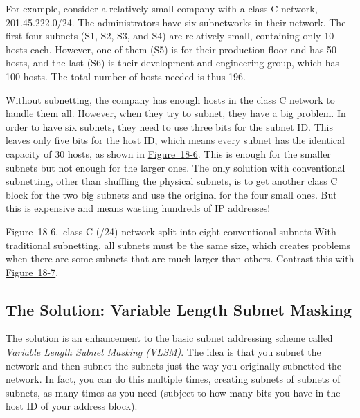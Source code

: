 \documentclass[b5paper,11pt]{memoir}
\begin{document}
For example, consider a relatively small company with a class C network,
201.45.222.0/24. The administrators have six subnetworks in their
network. The first four subnets (S1, S2, S3, and S4) are relatively
small, containing only 10 hosts each. However, one of them (S5) is for
their production floor and has 50 hosts, and the last (S6) is their
development and engineering group, which has 100 hosts. The total number
of hosts needed is thus 196.

Without subnetting, the company has enough hosts in the class C network
to handle them all. However, when they try to subnet, they have a big
problem. In order to have six subnets, they need to use three bits for
the subnet ID. This leaves only five bits for the host ID, which means
every subnet has the identical capacity of 30 hosts, as shown in
\protect\hyperlink{ch18s08.htmlux5cux23class_c_24_network_split_into_eight_conv}{Figure~18-6}.
This is enough for the smaller subnets but not enough for the larger
ones. The only solution with conventional subnetting, other than
shuffling the physical subnets, is to get another class C block for the
two big subnets and use the original for the four small ones. But this
is expensive and means wasting hundreds of IP addresses!

\protect\hypertarget{ch18s08.htmlux5cux23class_c_24_network_split_into_eight_conv}{}{}

\protect\hypertarget{ch18s08.htmlux5cux23I_mediaobject4_d1e20420}{}{}

Figure~18-6.~class C (/24) network split into eight conventional subnets
With traditional subnetting, all subnets must be the same size, which
creates problems when there are some subnets that are much larger than
others. Contrast this with
\protect\hyperlink{ch18s08.htmlux5cux23class_c_24_network_split_using_vlsm_usin}{Figure~18-7}.

\subsection[The Solution: Variable Length Subnet
Masking]{\texorpdfstring{\protect\hypertarget{ch18s08.htmlux5cux23the_solution_variable_length_subnet_mask}{}{}The
Solution: Variable Length Subnet
Masking}{The Solution: Variable Length Subnet Masking}}

\protect\hypertarget{ch18s08.htmlux5cux23idx-CHP-18-0743}{}{}The
solution is an enhancement to the basic subnet addressing scheme called
{\emph{Variable Length Subnet Masking (VLSM)}}. The idea is that you
subnet the network and then subnet the subnets just the way you
originally subnetted the network. In fact, you can do this multiple
times, creating subnets of subnets of subnets, as many times as you need
(subject to how many bits you have in the host ID of your address
block).
\end{document}
